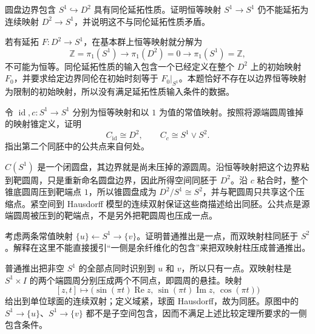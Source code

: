 \begin{exercise}\label{g2:ex:HEP-not-extension}
	圆盘边界包含 \(S^1\hookrightarrow D^2\) 具有同伦延拓性质。证明恒等映射 \(S^1\to S^1\) 仍不能延拓为连续映射 \(D^2\to S^1\)，并说明这不与同伦延拓性质矛盾。
\end{exercise}
\begin{solution}
	若有延拓 \(F:D^2\to S^1\)，在基本群上恒等映射就分解为
	\[
		\mathbb Z=\pi_1(S^1)\longrightarrow\pi_1(D^2)=0
		\longrightarrow\pi_1(S^1)=\mathbb Z,
	\]
	不可能为恒等。同伦延拓性质的输入包含一个已经定义在整个 \(D^2\) 上的初始映射 \(F_0\)，并要求给定边界同伦在初始时刻等于 \(F_0|_{S^1}\)。本题恰好不存在以边界恒等映射为限制的初始映射，所以没有满足延拓性质输入条件的数据。
\end{solution}

\begin{exercise}\label{g2:ex:two-mapping-cones}
	令 \(\operatorname{id},c:S^1\to S^1\) 分别为恒等映射和以 \(1\) 为值的常值映射。按照将源端圆周锥掉的映射锥定义，证明
	\[
		C_{\operatorname{id}}\cong D^2,\qquad
		C_c\cong S^1\vee S^2.
	\]
	指出第二个同胚中的公共点来自何处。
\end{exercise}
\begin{solution}
	\(C(S^1)\) 是一个闭圆盘，其边界就是尚未压掉的源圆周。沿恒等映射把这个边界粘到靶圆周，只是重新命名圆盘边界，因此所得空间同胚于 \(D^2\)。沿 \(c\) 粘合时，整个锥底圆周压到靶端点 \(1\)，所以锥圆盘成为 \(D^2/S^1\cong S^2\)，并与靶圆周只共享这个压缩点。紧空间到 Hausdorff 模型的连续双射保证这些商描述给出同胚。公共点是源端圆周被压到的靶端点，不是另外把靶圆周也压成一点。
\end{solution}

\begin{exercise}\label{g2:ex:double-cone-pushout}
	考虑两条常值映射 \(\{u\}\leftarrow S^1\to\{v\}\)。证明普通推出是一点，而双映射柱同胚于 \(S^2\)。解释在这里不能直接援引“一侧是余纤维化的包含”来把双映射柱压成普通推出。
\end{exercise}
\begin{solution}
	普通推出把非空 \(S^1\) 的全部点同时识别到 \(u\) 和 \(v\)，所以只有一点。双映射柱是 \(S^1\times I\) 的两个端圆周分别压成两个不同点，即圆周的悬挂。映射
	\[
		[z,t]\longmapsto
		\bigl(\sin(\pi t)\operatorname{Re}z,\,
		\sin(\pi t)\operatorname{Im}z,\,
		\cos(\pi t)\bigr)
	\]
	给出到单位球面的连续双射；定义域紧，球面 Hausdorff，故为同胚。原图中的 \(S^1\to\{u\}\)、\(S^1\to\{v\}\) 都不是子空间包含，因而不满足上述比较定理所要求的一侧包含条件。
\end{solution}

